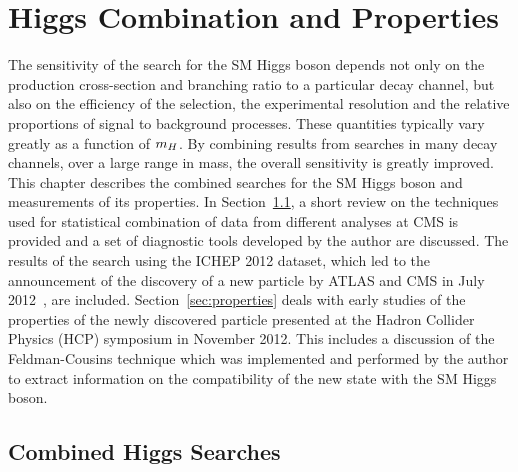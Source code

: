 \chapter{Higgs Combination and Properties}
\label{chap:combinations}

The sensitivity 
of the search for the SM Higgs boson depends not only on the production cross-section and 
branching ratio to a particular decay channel, but also on the efficiency
of the selection, the experimental resolution and the relative proportions of 
signal to background processes. These quantities typically vary greatly as a function of 
$m_{H}$. By combining results from searches
in many decay channels, over a large range in mass, 
the overall sensitivity is greatly improved.
This chapter describes the combined searches for the SM Higgs boson and measurements of its properties. 
In Section~\ref{sec:combinationmethodology}, a short review on the techniques used for statistical combination of data from different analyses at CMS is provided and a set of diagnostic
tools developed by the author are discussed.
The results of the search using the ICHEP 2012 dataset, 
which led to the announcement of the discovery of a new particle 
by ATLAS and CMS in July 2012~\citep{HIG-12-028}, are included.
Section~\ref{sec:properties} deals with early studies of the 
properties of the newly discovered particle presented at the Hadron Collider Physics (HCP) 
symposium in November 2012. This includes a discussion of 
the Feldman-Cousins technique which was implemented and performed
by the author to extract information on the compatibility of the new 
state with the SM Higgs boson.

\section{Combined Higgs Searches}
\label{sec:combinationmethodology}

